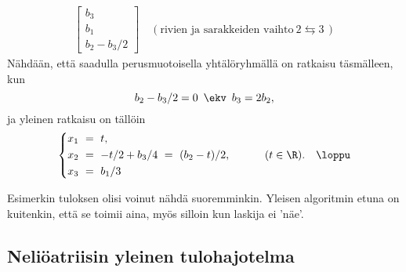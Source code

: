 \begin{Exa}
\begin{align*}
\begin{bmatrix} b_3 \\ b_1 \\ b_2 - b_3/2 \end{bmatrix} 
\quad (\text{rivien ja sarakkeiden vaihto}\ 2 \leftrightarrows 3\,)
\end{align*}
Nähdään, että saadulla perusmuotoisella yhtälöryhmällä on ratkaisu täsmälleen, kun
\[
b_2-b_3/2=0\,\ \ekv\,\ b_3 = 2b_2,
\]
ja yleinen ratkaisu on tällöin
\[
\left\{ \begin{aligned} 
x_1\ &=\ t, \\ x_2\ &=\ -t/2 + b_3/4\ =\ (b_2 - t)/2, \\ x_3\ &=\ b_1/3 
\end{aligned} \right. \qquad\quad (t \in \R). \quad\loppu
\]
\end{Exa}
Esimerkin tuloksen olisi voinut nähdä suoremminkin. Yleisen algoritmin etuna on kuitenkin, että
se toimii aina, myös silloin kun laskija ei 'näe'.

\subsection{Neliöatriisin yleinen tulohajotelma}

